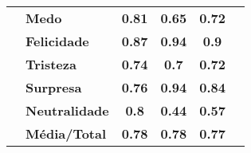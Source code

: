 \begin{table}[]
\begin{tabular}{llcccc}
                                       & \textbf{Medo}         & \textbf{0.81}                         & \textbf{0.65}                          & \textbf{0.72}                         &                                       \\
                                       & \textbf{Felicidade}   & \textbf{0.87}                         & \textbf{0.94}                          & \textbf{0.9}                          &                                       \\
                                       & \textbf{Tristeza}     & \textbf{0.74}                         & \textbf{0.7}                           & \textbf{0.72}                         &                                       \\
                                       & \textbf{Surpresa}     & \textbf{0.76}                         & \textbf{0.94}                          & \textbf{0.84}                         &                                       \\
                                       & \textbf{Neutralidade} & \textbf{0.8}                          & \textbf{0.44}                          & \textbf{0.57}                         &                                       \\
                                       & \textbf{Média/Total}  & \textbf{0.78}                         & \textbf{0.78}                          & \textbf{0.77}                         &                                       \\ \hline
\end{tabular}
\end{table}
